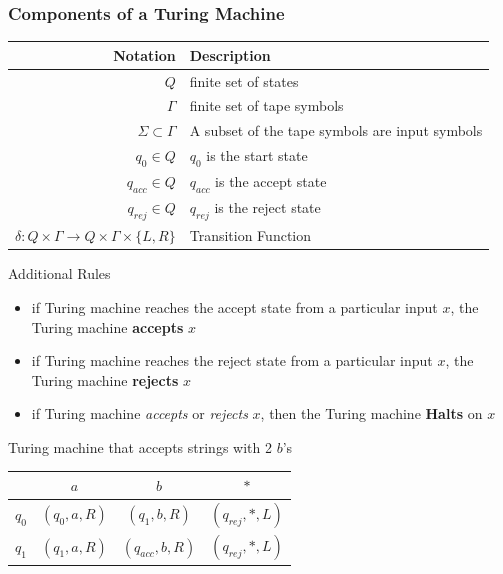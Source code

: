 \subsubsection*{Components of a Turing Machine}
\begin{center}
  \begin{tabular}{r|l}
    Notation                                                              & Description                                    \\
    \hline
    $Q$                                                                   & finite set of states                           \\
    $\Gamma$                                                              & finite set of tape symbols                     \\
    $\Sigma \subset \Gamma$                                               & A subset of the tape symbols are input symbols \\
    $q_0 \in Q$                                                           & $q_0$ is the start state                       \\
    $q_{acc} \in Q$                                                       & $q_{acc}$ is the accept state                  \\
    $q_{rej} \in Q$                                                       & $q_{rej}$ is the reject state                  \\
    $\delta : Q \times \Gamma \rightarrow Q \times \Gamma \times \{L,R\}$ & Transition Function
  \end{tabular}
\end{center}
Additional Rules
\begin{itemize}
  \item if Turing machine reaches the accept state from a particular input $x$, the Turing machine \textbf{accepts} $x$
  \item if Turing machine reaches the reject state from a particular input $x$, the Turing machine \textbf{rejects} $x$
  \item if Turing machine \textit{accepts} or \textit{rejects} $x$, then the Turing machine \textbf{Halts} on $x$
\end{itemize}
Turing machine that accepts strings with 2 $b$'s
\begin{center}
  \begin{tabular}{c|ccc}
          & $a$         & $b$             & $*$             \\
    \hline
    $q_0$ & $(q_0,a,R)$ & $(q_1,b,R)$     & $(q_{rej},*,L)$ \\
    $q_1$ & $(q_1,a,R)$ & $(q_{acc},b,R)$ & $(q_{rej},*,L)$
  \end{tabular}
\end{center}
